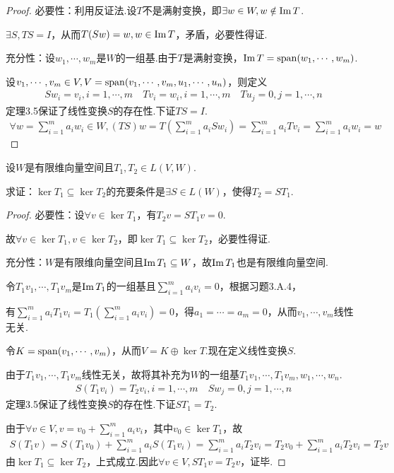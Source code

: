 \begin{proof}
    必要性：利用反证法.设\(T\)不是满射变换，即\(\exists w\in W,w\notin \operatorname{Im} T\).

    \(\exists S,TS=I\)，从而\(T(Sw)=w,w\in \operatorname{Im} T\)，矛盾，必要性得证.
    
    充分性：设\(w_1,\cdots,w_m\)是\(W\)的一组基.由于\(T\)是满射变换，\(\operatorname{Im} T=\operatorname{span} (w_1,\cdots,w_m)\).
    
    设\(v_1,\cdots,v_m\in V,V=\operatorname{span} (v_1,\cdots,v_m,u_1,\cdots,u_n)\)，则定义
    \begin{align*}
        Sw_i=v_i,i=1,\cdots,m \quad
        Tv_i=w_i,i=1,\cdots,m \quad Tu_j=0,j=1,\cdots,n
    \end{align*}
    定理3.5保证了线性变换\(S\)的存在性.下证\(TS=I\).
    \begin{align*}
        \forall w=\sum_{i=1}^m a_iw_i\in W,(TS)w=T(\sum_{i=1}^m a_iSw_i) 
        =\sum_{i=1}^m a_iTv_i=\sum_{i=1}^m a_iw_i=w
    \end{align*}
\end{proof}

\begin{problem}[24]\label{3.B.24}
    设\(W\)是有限维向量空间且\(T_1,T_2 \in L(V,W)\).

    求证：\(\ker T_1 \subseteq \ker T_2\)的充要条件是\(\exists S \in L(W)\)，使得\(T_2=ST_1\).        
\end{problem}

\begin{proof}
    必要性：设\(\forall v \in \ker T_1\)，有\(T_2v=ST_1v=0\).

    故\(\forall v \in \ker T_1, v \in \ker T_2\)，即\(\ker T_1 \subseteq \ker T_2\)，必要性得证.
    
    充分性：\(W\)是有限维向量空间且\(\operatorname{Im} T_1 \subseteq W\)，故\(\operatorname{Im} T_1\)也是有限维向量空间.
    
    令\(T_1v_1,\cdots,T_1v_m\)是\(\operatorname{Im} T_1\)的一组基且\(\sum_{i=1}^m a_iv_i=0\)，根据习题3.A.4，%
    
    有\(\sum_{i=1}^m a_iT_1v_i=T_1(\sum_{i=1}^m a_iv_i)=0\)，得\(a_1=\cdots=a_m=0\)，从而\(v_1,\cdots,v_m\)线性无关.
    
    令\(K=\operatorname{span} (v_1,\cdots,v_m)\)，从而\(V=K \oplus \ker T\).现在定义线性变换\(S\).
    
    由于\(T_1v_1,\cdots,T_1v_m\)线性无关，故将其补充为\(W\)的一组基\(T_1v_1,\cdots,T_1v_m,w_1,\cdots,w_n\).
    \begin{align*}
        S(T_1v_i)=T_2v_i,i=1,\cdots,m \quad Sw_j=0,j=1,\cdots,n
    \end{align*}
    定理3.5保证了线性变换\(S\)的存在性.下证\(ST_1=T_2\).
    
    由于\(\forall v \in V, v=v_0+\sum_{i=1}^m a_iv_i\)，其中\(v_0 \in \ker T_1\)，故
    \begin{align*}
        S(T_1v)=S(T_1v_0)+\sum_{i=1}^m a_iS(T_1v_i)
        =\sum_{i=1}^m a_iT_2v_i=T_2v_0+\sum_{i=1}^m a_iT_2v_i=T_2v
    \end{align*}
    由\(\ker T_1 \subseteq \ker T_2\)，上式成立.因此\(\forall v \in V, ST_1v=T_2v\)，证毕.
\end{proof}

